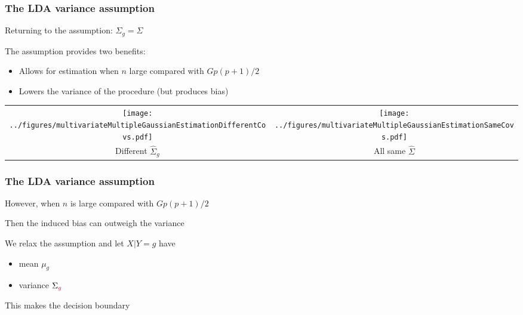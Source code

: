 \documentclass[12pt]{beamer}
\begin{document}
\begin{frame}[fragile]
\frametitle{The LDA variance assumption}
Returning to the assumption: $\Sigma_g = \Sigma$

\vsp
The assumption provides two benefits:
\begin{itemize}
\item Allows for estimation when $n$  large compared with $Gp(p+1)/2$ 
\item Lowers the variance of the procedure (but produces bias)

\end{itemize}


\begin{table}
\centering
\begin{tabular}{cc}
\texttt{[image: ../figures/multivariateMultipleGaussianEstimationDifferentCovs.pdf]}
&
\texttt{[image: ../figures/multivariateMultipleGaussianEstimationSameCovs.pdf]}\\
Different $\hat\Sigma_g$ & All same $\hat\Sigma$ 
\end{tabular}
\end{table}
\end{frame}

\begin{frame}[fragile]
\frametitle{The LDA variance assumption}
However, when $n$ is large compared with $Gp(p+1)/2$ 


\vsp

Then the induced bias can outweigh the variance


\vsp

We relax the assumption and let  $X | Y=g$ have 
\begin{itemize}
\item mean $\mu_g$ 
\item variance $\Sigma_{\alr{g}}$
\end{itemize}

\vsp
This makes the decision boundary  

\end{frame}

\begin{frame}
\end{frame}
\end{document}
